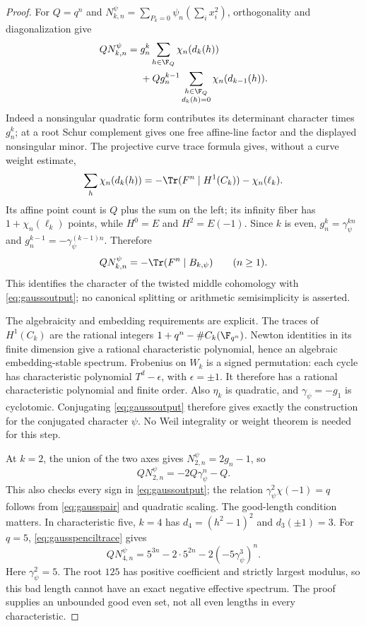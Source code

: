 \begin{proof}
For $Q=q^n$ and
$N_{k,n}^\psi=\sum_{P_k=0}\psi_n(\sum_i x_i^2)$,
orthogonality and diagonalization give
\begin{align}
 QN_{k,n}^\psi
 ={}&g_n^k\sum_{h\in\F_Q}\chi_n(d_k(h))\notag\\
 &+Qg_n^{k-1}
       \sum_{\substack{h\in\F_Q\\d_k(h)=0}}
                         \chi_n(d_{k-1}(h)).
 \label{eq:gausspenciltrace}
\end{align}
Indeed a nonsingular quadratic form contributes its
determinant character times $g_n^k$; at a root Schur
complement gives one free affine-line factor and the
displayed nonsingular minor. The projective curve trace
formula gives, without a curve weight estimate,
\[
 \sum_h\chi_n(d_k(h))
 =-\Tr(F^n\mid H^1(C_k))-\chi_n(\ell_k).
\]
Its affine point count is $Q$ plus the sum on the left;
its infinity fiber has $1+\chi_n(\ell_k)$ points, while
$H^0=E$ and $H^2=E(-1)$.
Since $k$ is even, $g_n^k=\gamma_\psi^{kn}$ and
$g_n^{k-1}=-\gamma_\psi^{(k-1)n}$. Therefore
\begin{equation}\label{eq:gaussnegativesign}
 QN_{k,n}^\psi=-\Tr(F^n\mid B_{k,\psi})
                      \qquad(n\ge1).
\end{equation}
This identifies the character of the twisted middle
cohomology with \eqref{eq:gaussoutput}; no canonical
splitting or arithmetic semisimplicity is asserted.

The algebraicity and embedding requirements are explicit.
The traces of $H^1(C_k)$ are the rational integers
$1+q^n-\#C_k(\F_{q^n})$. Newton identities in its finite
dimension give a rational characteristic polynomial, hence
an algebraic embedding-stable spectrum. Frobenius on $W_k$
is a signed permutation: each cycle has characteristic polynomial
$T^d-\epsilon$, with $\epsilon=\pm1$. It therefore has a rational
characteristic polynomial and finite order. Also $\eta_k$ is quadratic, and
$\gamma_\psi=-g_1$ is cyclotomic. Conjugating
\eqref{eq:gaussoutput} therefore gives exactly the
construction for the conjugated character $\psi$.
No Weil integrality or weight theorem is needed for this step.

At $k=2$, the union of the two axes gives
$N_{2,n}^\psi=2g_n-1$, so
\[
 QN_{2,n}^\psi=-2Q\gamma_\psi^n-Q.
\]
This also checks every sign in \eqref{eq:gaussoutput};
the relation $\gamma_\psi^2\chi(-1)=q$ follows from
\eqref{eq:gausspair} and quadratic scaling.
The good-length condition matters. In characteristic five,
$k=4$ has $d_4=(h^2-1)^2$ and $d_3(\pm1)=3$.
For $q=5$, \eqref{eq:gausspenciltrace} gives
\[
 QN_{4,n}^\psi=5^{3n}-2\cdot5^{2n}
                         -2(-5\gamma_\psi^3)^n.
\]
Here $\gamma_\psi^2=5$. The root $125$ has positive
coefficient and strictly largest modulus, so this bad
length cannot have an exact negative effective spectrum.
The proof supplies an unbounded good even set, not all
even lengths in every characteristic.


\end{proof}
